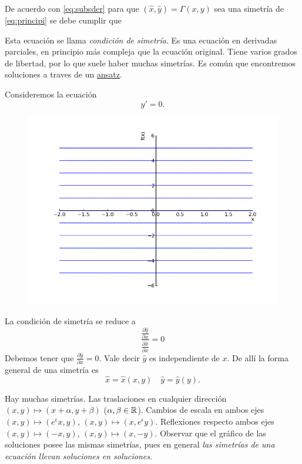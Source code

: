 De acuerdo con \eqref{eq:subsder} para que $(\hat{x},\hat{y})=\Gamma(x,y)$ sea una simetría de \eqref{eq:principi} se debe cumplir que

 Esta ecuación se llama \emph{condición de simetría}. Es una ecuación en derivadas parciales, en principio más compleja que la ecuación original. Tiene varios grados de libertad, por lo que suele haber muchas simetrías.  Es común que encontremos soluciones a  traves de un  \href{http://es.wikipedia.org/wiki/Ansatz}{ansatz}.\link





 \begin{ejemplo} Consideremos la ecuación
   \begin{equation}\label{eq:trivial}y'=0.
    \end{equation}
    \begin{figure}
   \vspace{-.5cm}\includegraphics[scale=.3]{imagenes/sol_trivial.png}
 \end{figure}
La condición de simetría se reduce a 
\[
\frac{\frac{\partial\hat{y}}{\partial x}}{\frac{\partial\hat{x}}{\partial x}}=0
\]
Debemos tener que $\frac{\partial\hat{y}}{\partial x}=0$. Vale decir $\hat{y}$ es independiente de $x$. De allí la forma general de una simetría es 
\[\hat{x}=\hat{x}(x,y)\quad \hat{y}=\hat{y}(y).\]
\end{ejemplo}
 Hay muchas simetrías. Las traslaciones en cualquier dirección $(x,y)\mapsto (x+\alpha ,y+\beta)$ ($\alpha,\beta\in\mathbb{R}$). Cambios de escala en ambos ejes  $(x,y)\mapsto (e^{\epsilon}x,y)$, $(x,y)\mapsto (x,e^{\epsilon}y)$. Reflexiones respecto ambos ejes  $(x,y)\mapsto (-x,y)$, $(x,y)\mapsto (x,-y)$.  Observar que el gráfico de las soluciones posee las mismas simetrías, pues en general \emph{las simetrías de una ecuación llevan soluciones en soluciones}.

